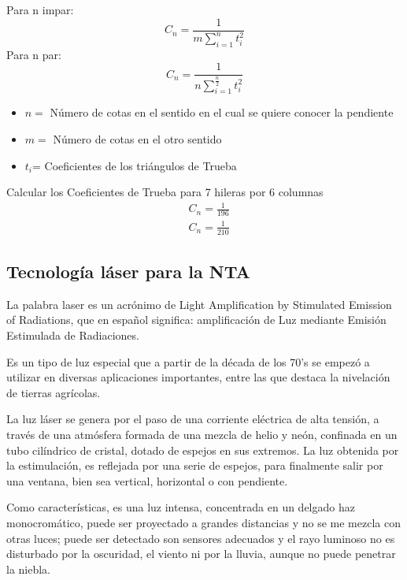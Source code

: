 Para n impar:
\begin{equation}
    C_n = \frac{1}{m \sum_{i = 1}^{n} t_i^2}
\end{equation}
Para n par:
\begin{equation}
    C_n = \frac{1}{n\sum_{i =1}^{\frac{n}{2}}t_i^2}
\end{equation}
\begin{notation}
    \begin{itemize}
        \item $n=$ Número de cotas en el sentido en el cual se quiere conocer la pendiente
        \item $m=$ Número de cotas en el otro sentido
        \item $t_i$= Coeficientes de los triángulos de Trueba
    \end{itemize}
\end{notation}
\begin{example}
    Calcular los Coeficientes de Trueba para 7 hileras por 6 columnas
    \begin{align*}
        &C_n = \frac{1}{196}\\
        &C_n = \frac{1}{210}
    \end{align*}
\end{example}
\subsection{Tecnología láser para la NTA}
La palabra laser es un acrónimo de Light Amplification by Stimulated Emission of Radiations, que en español significa: amplificación de Luz mediante Emisión Estimulada de Radiaciones.

Es un tipo de luz especial que a partir de la década de los 70's se empezó a utilizar en diversas aplicaciones importantes, entre las que destaca la nivelación de tierras agrícolas.

La luz láser se genera por el paso de una corriente eléctrica de alta tensión, a través de una atmósfera formada de una mezcla de helio y neón, confinada en un tubo cilíndrico de cristal, dotado de espejos en sus extremos. La luz obtenida por la estimulación, es reflejada por una serie de espejos, para finalmente salir por una ventana, bien sea vertical, horizontal o con pendiente.

Como características, es una luz intensa, concentrada en un delgado haz monocromático, puede ser proyectado a grandes distancias y no se me mezcla con otras luces; puede ser detectado son sensores adecuados y el rayo luminoso no es disturbado por la oscuridad, el viento ni por la lluvia, aunque no puede penetrar la niebla.

